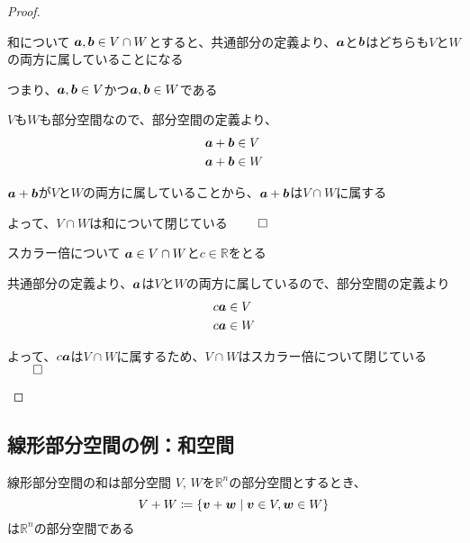 \documentclass[../../../topic_linear-algebra]{subfiles}
\begin{document}
\begin{proof}
  \begin{subpattern}{和について}
    $\vb*{a}, \vb*{b} \in V \cap W$とすると、共通部分の定義より、$\vb*{a}$と$\vb*{b}$はどちらも$V$と$W$の両方に属していることになる

    つまり、$\vb*{a}, \vb*{b} \in V$かつ$\vb*{a}, \vb*{b} \in W$である

    \br

    $V$も$W$も部分空間なので、部分空間の定義より、
    \begin{align*}
      \vb*{a} + \vb*{b} & \in V \\
      \vb*{a} + \vb*{b} & \in W
    \end{align*}

    $\vb*{a} + \vb*{b}$が$V$と$W$の両方に属していることから、$\vb*{a} + \vb*{b}$は$V \cap W$に属する

    よって、$V \cap W$は和について閉じている $\qed$
  \end{subpattern}

  \begin{subpattern}{スカラー倍について}
    $\vb*{a} \in V \cap W$と$c \in \mathbb{R}$をとる

    共通部分の定義より、$\vb*{a}$は$V$と$W$の両方に属しているので、部分空間の定義より
    \begin{align*}
      c \vb*{a} & \in V \\
      c \vb*{a} & \in W
    \end{align*}

    よって、$c \vb*{a}$は$V \cap W$に属するため、$V \cap W$はスカラー倍について閉じている $\qed$
  \end{subpattern}
\end{proof}

\subsection{線形部分空間の例：和空間}

\begin{theorem}{線形部分空間の和は部分空間}
  $V,\,W$を$\mathbb{R}^n$の部分空間とするとき、
  \begin{equation*}
    V + W \coloneq \{ \vb*{v} + \vb*{w} \mid \vb*{v} \in V, \vb*{w} \in W \}
  \end{equation*}
  は$\mathbb{R}^n$の部分空間である
\end{theorem}
\end{document}
